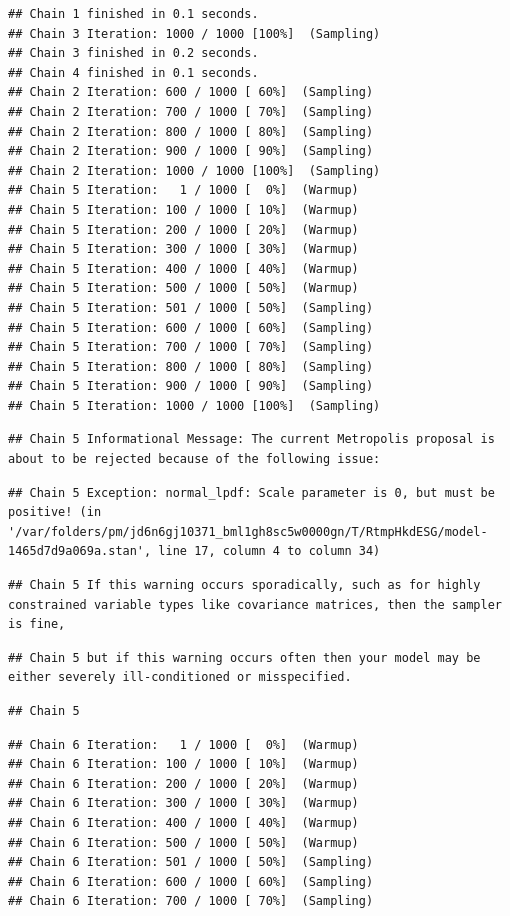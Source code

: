 \documentclass[
]{article}
\begin{document}
\begin{verbatim}
## Chain 1 finished in 0.1 seconds.
## Chain 3 Iteration: 1000 / 1000 [100%]  (Sampling) 
## Chain 3 finished in 0.2 seconds.
## Chain 4 finished in 0.1 seconds.
## Chain 2 Iteration: 600 / 1000 [ 60%]  (Sampling) 
## Chain 2 Iteration: 700 / 1000 [ 70%]  (Sampling) 
## Chain 2 Iteration: 800 / 1000 [ 80%]  (Sampling) 
## Chain 2 Iteration: 900 / 1000 [ 90%]  (Sampling) 
## Chain 2 Iteration: 1000 / 1000 [100%]  (Sampling) 
## Chain 5 Iteration:   1 / 1000 [  0%]  (Warmup) 
## Chain 5 Iteration: 100 / 1000 [ 10%]  (Warmup) 
## Chain 5 Iteration: 200 / 1000 [ 20%]  (Warmup) 
## Chain 5 Iteration: 300 / 1000 [ 30%]  (Warmup) 
## Chain 5 Iteration: 400 / 1000 [ 40%]  (Warmup) 
## Chain 5 Iteration: 500 / 1000 [ 50%]  (Warmup) 
## Chain 5 Iteration: 501 / 1000 [ 50%]  (Sampling) 
## Chain 5 Iteration: 600 / 1000 [ 60%]  (Sampling) 
## Chain 5 Iteration: 700 / 1000 [ 70%]  (Sampling) 
## Chain 5 Iteration: 800 / 1000 [ 80%]  (Sampling) 
## Chain 5 Iteration: 900 / 1000 [ 90%]  (Sampling) 
## Chain 5 Iteration: 1000 / 1000 [100%]  (Sampling)
\end{verbatim}

\begin{verbatim}
## Chain 5 Informational Message: The current Metropolis proposal is about to be rejected because of the following issue:
\end{verbatim}

\begin{verbatim}
## Chain 5 Exception: normal_lpdf: Scale parameter is 0, but must be positive! (in '/var/folders/pm/jd6n6gj10371_bml1gh8sc5w0000gn/T/RtmpHkdESG/model-1465d7d9a069a.stan', line 17, column 4 to column 34)
\end{verbatim}

\begin{verbatim}
## Chain 5 If this warning occurs sporadically, such as for highly constrained variable types like covariance matrices, then the sampler is fine,
\end{verbatim}

\begin{verbatim}
## Chain 5 but if this warning occurs often then your model may be either severely ill-conditioned or misspecified.
\end{verbatim}

\begin{verbatim}
## Chain 5
\end{verbatim}

\begin{verbatim}
## Chain 6 Iteration:   1 / 1000 [  0%]  (Warmup) 
## Chain 6 Iteration: 100 / 1000 [ 10%]  (Warmup) 
## Chain 6 Iteration: 200 / 1000 [ 20%]  (Warmup) 
## Chain 6 Iteration: 300 / 1000 [ 30%]  (Warmup) 
## Chain 6 Iteration: 400 / 1000 [ 40%]  (Warmup) 
## Chain 6 Iteration: 500 / 1000 [ 50%]  (Warmup) 
## Chain 6 Iteration: 501 / 1000 [ 50%]  (Sampling) 
## Chain 6 Iteration: 600 / 1000 [ 60%]  (Sampling) 
## Chain 6 Iteration: 700 / 1000 [ 70%]  (Sampling)
\end{verbatim}
\end{document}

